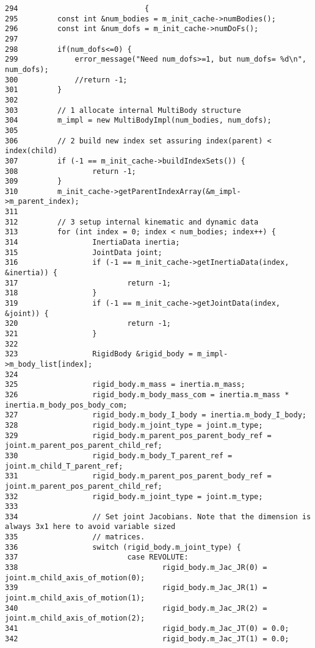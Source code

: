 \begin{Code}\begin{verbatim}294                             {
295         const int &num_bodies = m_init_cache->numBodies();
296         const int &num_dofs = m_init_cache->numDoFs();
297 
298         if(num_dofs<=0) {
299             error_message("Need num_dofs>=1, but num_dofs= %d\n", num_dofs);
300             //return -1;
301         }
302 
303         // 1 allocate internal MultiBody structure
304         m_impl = new MultiBodyImpl(num_bodies, num_dofs);
305 
306         // 2 build new index set assuring index(parent) < index(child)
307         if (-1 == m_init_cache->buildIndexSets()) {
308                 return -1;
309         }
310         m_init_cache->getParentIndexArray(&m_impl->m_parent_index);
311 
312         // 3 setup internal kinematic and dynamic data
313         for (int index = 0; index < num_bodies; index++) {
314                 InertiaData inertia;
315                 JointData joint;
316                 if (-1 == m_init_cache->getInertiaData(index, &inertia)) {
317                         return -1;
318                 }
319                 if (-1 == m_init_cache->getJointData(index, &joint)) {
320                         return -1;
321                 }
322 
323                 RigidBody &rigid_body = m_impl->m_body_list[index];
324 
325                 rigid_body.m_mass = inertia.m_mass;
326                 rigid_body.m_body_mass_com = inertia.m_mass * inertia.m_body_pos_body_com;
327                 rigid_body.m_body_I_body = inertia.m_body_I_body;
328                 rigid_body.m_joint_type = joint.m_type;
329                 rigid_body.m_parent_pos_parent_body_ref = joint.m_parent_pos_parent_child_ref;
330                 rigid_body.m_body_T_parent_ref = joint.m_child_T_parent_ref;
331                 rigid_body.m_parent_pos_parent_body_ref = joint.m_parent_pos_parent_child_ref;
332                 rigid_body.m_joint_type = joint.m_type;
333 
334                 // Set joint Jacobians. Note that the dimension is always 3x1 here to avoid variable sized
335                 // matrices.
336                 switch (rigid_body.m_joint_type) {
337                         case REVOLUTE:
338                                 rigid_body.m_Jac_JR(0) = joint.m_child_axis_of_motion(0);
339                                 rigid_body.m_Jac_JR(1) = joint.m_child_axis_of_motion(1);
340                                 rigid_body.m_Jac_JR(2) = joint.m_child_axis_of_motion(2);
341                                 rigid_body.m_Jac_JT(0) = 0.0;
342                                 rigid_body.m_Jac_JT(1) = 0.0;

\end{verbatim}
\end{Code}
